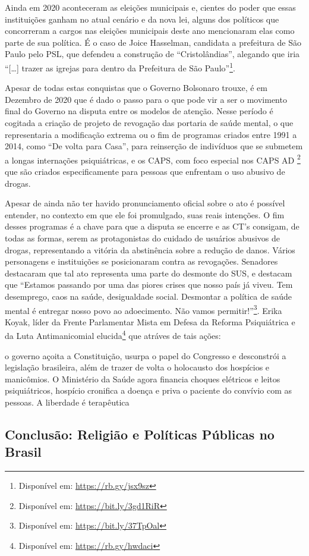 \documentclass[
	12pt,				%
	oneside,			%
	a4paper,			%
	sumario=tradicional,
	english,			%
	brazil				%
	]{abntex2}
\begin{document}
Ainda em 2020 aconteceram as eleições municipais e, cientes do poder que essas instituições ganham no atual cenário e da nova lei, alguns dos políticos que concorreram a cargos nas eleições municipais deste ano mencionaram elas como parte de sua política. É o caso de Joice Hasselman, candidata a prefeitura de São Paulo pelo PSL, que defendeu a construção de ``Cristolândias'', alegando que iria ``{[}\ldots{]} trazer as igrejas para dentro da Prefeitura de São Paulo''\footnote{Disponível em: \url{https://rb.gy/jsx9sz}}.

Apesar de todas estas conquistas que o Governo Bolsonaro trouxe, é em Dezembro de 2020 que é dado o passo para o que pode vir a ser o movimento final do Governo na disputa entre os modelos de atenção. Nesse período é cogitada a criação de projeto de revogação das portaria de saúde mental, o que representaria a modificação extrema ou o fim de programas criados entre 1991 a 2014, como ``De volta para Casa'', para reinserção de indivíduos que se submetem a longas internações psiquiátricas, e os CAPS, com foco especial nos CAPS AD \footnote{Disponível em: \url{https://bit.ly/3gd1RiR}} que são criados especificamente para pessoas que enfrentam o uso abusivo de drogas.

Apesar de ainda não ter havido pronunciamento oficial sobre o ato é possível entender, no contexto em que ele foi promulgado, suas reais intenções. O fim desses programas é a chave para que a disputa se encerre e as CT's consigam, de todas as formas, serem as protagonistas do cuidado de usuários abusivos de drogas, representando a vitória da abstinência sobre a redução de danos. Vários personagens e instituições se posicionaram contra as revogações. Senadores destacaram que tal ato representa uma parte do desmonte do SUS, e destacam que ``Estamos passando por uma das piores crises que nosso país já viveu. Tem desemprego, caos na saúde, desigualdade social. Desmontar a política de saúde mental é entregar nosso povo ao adoecimento. Não vamos permitir!''\footnote{Disponível em: \url{https://bit.ly/37TpOal}}. Erika Koyak, líder da Frente Parlamentar Mista em Defesa da Reforma Psiquiátrica e da Luta Antimanicomial elucida\footnote{Disponível em: \url{https://rb.gy/hwdaci}} que atráves de tais ações:
\begin{quoting}[rightmargin=0cm,leftmargin=4cm]
\begin{singlespace}
{\footnotesize
o governo açoita a Constituição, usurpa o papel do Congresso e desconstrói a legislação brasileira, além de trazer de volta o holocausto dos hospícios e manicômios. O Ministério da Saúde agora financia choques elétricos e leitos psiquiátricos, hospício cronifica a doença e priva o paciente do convívio com as pessoas. A liberdade é terapêutica}
\end{singlespace}
\end{quoting}
\hypertarget{conclusuxe3o-religiuxe3o-e-poluxedticas-puxfablicas-no-brasil}{%
\subsection{Conclusão: Religião e Políticas Públicas no Brasil}\label{conclusuxe3o-religiuxe3o-e-poluxedticas-puxfablicas-no-brasil}}
\end{document}
